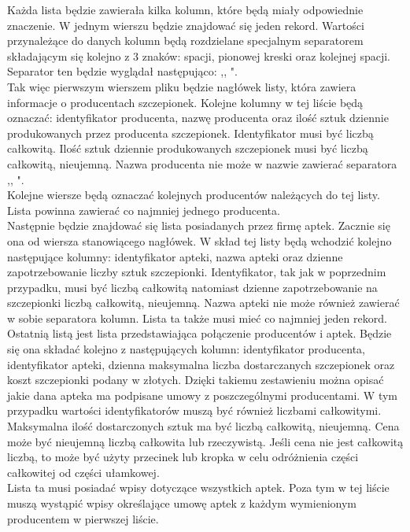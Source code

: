 \documentclass[12pt]{article}
\begin{document}
\quad Każda lista będzie zawierała kilka kolumn, które będą miały odpowiednie znaczenie. 
W jednym wierszu będzie znajdować się jeden rekord. Wartości przynależące do danych kolumn będą rozdzielane specjalnym separatorem składającym się kolejno z 3 znaków: spacji, pionowej kreski oraz kolejnej spacji. Separator ten będzie wyglądał następująco: ,, {\textbar} ". \\
Tak więc pierwszym wierszem pliku będzie nagłówek listy, która zawiera informacje o producentach szczepionek. Kolejne kolumny w tej liście będą oznaczać: identyfikator producenta, nazwę producenta oraz ilość sztuk dziennie produkowanych przez producenta szczepionek. Identyfikator musi być liczbą całkowitą. Ilość sztuk dziennie produkowanych szczepionek musi być liczbą całkowitą, nieujemną. Nazwa producenta nie może w nazwie zawierać separatora ,, {\textbar} ".   \\
Kolejne wiersze będą oznaczać kolejnych producentów należących do tej listy. Lista powinna zawierać co najmniej jednego producenta. \\
Następnie będzie znajdować się lista posiadanych przez firmę aptek. Zacznie się ona od wiersza stanowiącego nagłówek. W skład tej listy będą wchodzić kolejno następujące kolumny: identyfikator apteki, nazwa apteki oraz dzienne zapotrzebowanie liczby sztuk szczepionki. Identyfikator, tak jak w poprzednim przypadku, musi być liczbą całkowitą natomiast dzienne zapotrzebowanie na szczepionki liczbą całkowitą, nieujemną. Nazwa apteki nie może również zawierać w sobie separatora kolumn. Lista ta także musi mieć co najmniej jeden rekord. \\
Ostatnią listą jest lista przedstawiająca połączenie producentów i aptek. Będzie się ona składać kolejno z następujących  kolumn: identyfikator producenta, identyfikator apteki, dzienna maksymalna liczba dostarczanych szczepionek oraz koszt szczepionki podany w złotych. Dzięki takiemu zestawieniu można opisać jakie dana apteka ma podpisane umowy z poszczególnymi producentami. W tym przypadku wartości identyfikatorów muszą być również liczbami całkowitymi. Maksymalna ilość dostarczonych sztuk ma być liczbą całkowitą, nieujemną. Cena może być nieujemną liczbą całkowita lub rzeczywistą. Jeśli cena nie jest całkowitą liczbą, to może być użyty przecinek lub kropka w celu odróżnienia części całkowitej od części ułamkowej. \\
Lista ta musi posiadać wpisy dotyczące wszystkich aptek. Poza tym w tej liście muszą wystąpić wpisy określające umowę aptek z każdym wymienionym producentem w pierwszej liście.
\end{document}

